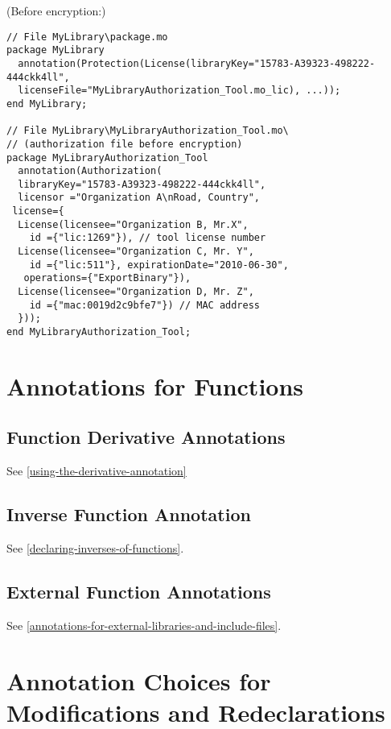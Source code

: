 \begin{example}
(Before encryption:)
\begin{lstlisting}[language=modelica]
// File MyLibrary\package.mo
package MyLibrary
  annotation(Protection(License(libraryKey="15783-A39323-498222-444ckk4ll",
  licenseFile="MyLibraryAuthorization_Tool.mo_lic), ...));
end MyLibrary;

// File MyLibrary\MyLibraryAuthorization_Tool.mo\
// (authorization file before encryption)
package MyLibraryAuthorization_Tool
  annotation(Authorization(
  libraryKey="15783-A39323-498222-444ckk4ll",
  licensor ="Organization A\nRoad, Country",
 license={
  License(licensee="Organization B, Mr.X",
    id ={"lic:1269"}), // tool license number
  License(licensee="Organization C, Mr. Y",
    id ={"lic:511"}, expirationDate="2010-06-30",
   operations={"ExportBinary"}),
  License(licensee="Organization D, Mr. Z",
    id ={"mac:0019d2c9bfe7"}) // MAC address
  }));
end MyLibraryAuthorization_Tool;
\end{lstlisting}
\end{example}

\section{Annotations for Functions}\label{annotations-for-functions}

\subsection{Function Derivative Annotations}\label{function-derivative-annotations}

See \cref{using-the-derivative-annotation}

\subsection{Inverse Function Annotation}\label{inverse-function-annotation}

See \cref{declaring-inverses-of-functions}.

\subsection{External Function Annotations}\label{external-function-annotations}

See \cref{annotations-for-external-libraries-and-include-files}.

\section{Annotation Choices for Modifications and Redeclarations}\label{annotation-choices-for-modifications-and-redeclarations}

